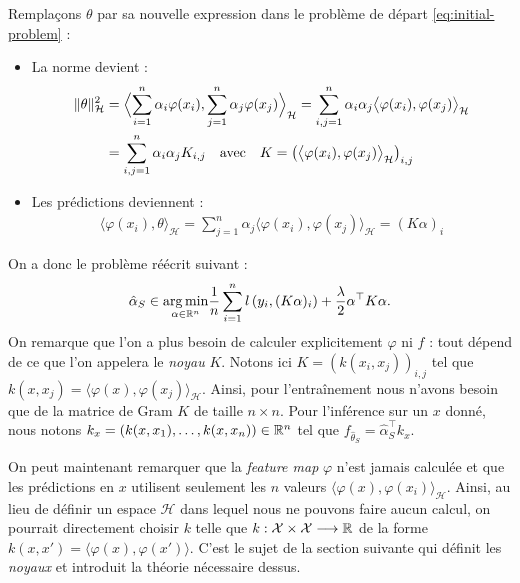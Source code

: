 \begin{proposition}
    Remplaçons $ \theta$ par sa nouvelle expression dans le problème de départ \ref{eq:initial-problem} : 
    \begin{itemize}
        \item La norme devient : 
        \begin{align*}
            \| \theta \|^2_{ \mathcal{H}} &= \Bigl\langle \sum_{i=1}^{n} \alpha_i \varphi(x_i), \sum_{j=1}^{n} \alpha_j \varphi(x_j) \Bigr\rangle_{ \mathcal{H}}
            = \sum_{i,j = 1}^{n} \alpha_i \alpha_j \bigl\langle \varphi(x_i), \varphi(x_j) \bigr\rangle_{ \mathcal{H}} \\ 
            &=  \sum_{i,j = 1}^{n} \alpha_i \alpha_j K_{i,j} \quad \text{avec} \quad K = \left( \bigl\langle \varphi(x_i), \varphi(x_j) \bigr\rangle_{ \mathcal{H}}\right)_{i,j}
        \end{align*}
        \item Les prédictions deviennent : 
        \begin{align*}
            \langle \varphi(x_i), \theta \rangle_{ \mathcal{H}} = \sum_{j=1}^{n} \alpha_j \langle \varphi(x_i), \varphi(x_j) \rangle_{ \mathcal{H}} = (K \alpha)_i
        \end{align*}
    \end{itemize}
    On a donc le problème réécrit suivant : 
    \begin{equation}
        \hat{ \alpha}_S \in \underset{ \alpha \in \mathbb{R}^n}{\arg \min} \frac{1}{n} \sum_{i=1}^{n} l \left(y_i , (K \alpha)_i\right) + \frac{ \lambda}{2} \alpha^\top K \alpha. 
    \end{equation}
    On remarque que l'on a plus besoin de calculer explicitement $ \varphi$ ni $f$ : tout dépend de ce que l'on appelera le \emph{noyau} $K$. 
    Notons ici $K = (k(x_i, x_j))_{i,j}$ tel que $k(x, x_j) = \langle \varphi(x), \varphi(x_j) \rangle_{ \mathcal{H}}$. Ainsi, pour l'entraînement nous n'avons besoin que de la matrice de Gram $K$ de taille $ n \times n$. Pour l'inférence sur un $x$ donné, nous notons $ k_x = (k(x, x_1), \dots, k(x, x_n)) \in \mathbb{R}^n$ tel que $ f_{ \hat{ \theta}_S} = \hat{ \alpha}_S^\top k_x$. 
\end{proposition}

On peut maintenant remarquer que la \emph{feature map} $ \varphi$ n'est jamais calculée et que les prédictions en $x$ utilisent seulement les $n$ valeurs $ \langle \varphi(x), \varphi(x_i) \rangle_{ \mathcal{H}}$. Ainsi, au lieu de définir un espace $ \mathcal{H}$ dans lequel nous ne pouvons faire aucun calcul, on pourrait directement choisir $k$ telle que $ k : \mathcal{X} \times \mathcal{X} \longrightarrow \mathbb{R}$ de la forme $ k(x, x') = \langle \varphi(x), \varphi(x') \rangle$. C'est le sujet de la section suivante qui définit les \emph{noyaux} et introduit la théorie nécessaire dessus. 

